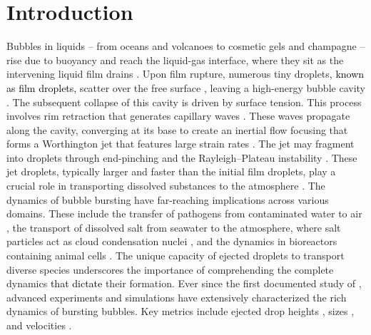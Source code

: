 \documentclass{jfm}
\newcommand{\AO}[1]{{\textcolor{black}{#1}}}
\newcommand{\KZ}[1]{{\textcolor{black}{#1}}}
\newcommand{\vsy}[1]{\todo[color=orange, bordercolor=none, textcolor=white]{Vatsal}\textcolor{orange}{#1}}
\begin{document}
\section{Introduction}
\label{sec:Intro}
Bubbles in liquids \citep{Lohse2018} -- from oceans \citep{deike2022mass} and volcanoes \citep{gonnermann2007fluid} to cosmetic gels \citep{lin1970mechanisms, daneshi2024growth} and champagne \citep{liger2012physics,mathijssen2023culinary} -- rise due to buoyancy and reach the liquid-gas interface, where they sit as the intervening liquid film drains \citep[figure~\ref{schematic}a-i,][]{lhuissier2012bursting, bartlett2023universal}.
Upon film rupture, numerous tiny droplets\AO{, known as film droplets,} scatter over the free surface \citep{lhuissier2012bursting,villermaux2022bubbles}, leaving a high-energy bubble cavity \citep[figure~\ref{schematic}a-ii,][]{woodcock1953giant,knelman1954mechanism,mason1954bursting}. The subsequent collapse of this cavity is driven by surface tension. This process involves rim retraction \citep{taylor-1959-procrsoclonda,culick-1960-japplphys,sanjay-2022-JFM} that generates capillary waves \citep{snoeijer2025coalescence}.
These waves propagate along the cavity, converging at its base to create an inertial flow focusing \citep{gordillo2019capillary,gordillo2023theory} that forms a Worthington jet \citep{worthington1877xxviii,worthington1908study,stuhlman1932mechanics,lohse2004impact,VatsalThesis} that features large strain rates \citep{sen2024elastocapillary}. The jet may fragment into droplets through end-pinching and the Rayleigh--Plateau instability \citep{rayleigh1878instability, plateau1873statique, keller1995blob, stone1989relaxation, ghabache2016size, walls2015jet}.
These jet droplets, typically larger and faster than the initial film droplets, play a crucial role in transporting dissolved substances to the atmosphere \citep{berny2020role,villermaux2022bubbles,dubitsky2023enrichment}.
The dynamics of bubble bursting have far-reaching implications across various domains. These include the transfer of pathogens from contaminated water to air \citep{bourouiba2021fluid}, the transport of dissolved salt from seawater to the atmosphere, where salt particles act as cloud condensation nuclei \citep{dubitsky2023effects, de2011production}, and the dynamics in bioreactors containing animal cells \citep{boulton1993gas}. The unique capacity of ejected droplets to transport diverse species underscores the importance of comprehending the complete dynamics \KZ{that dictate} their formation.
Ever since the first documented study of \citet{stuhlman1932mechanics}, advanced experiments and simulations have extensively characterized the rich dynamics of bursting bubbles.
Key metrics include ejected drop heights \citep{stuhlman1932mechanics}, sizes \citep{kientzler1954photographic,deike2018dynamics,berny2020role,berny2021statistics,blanco2020sea,villermaux2022bubbles}, and velocities \citep{deike2018dynamics, gordillo2019capillary, sanjay2021bursting, gordillo2023theory}.
\end{document}
